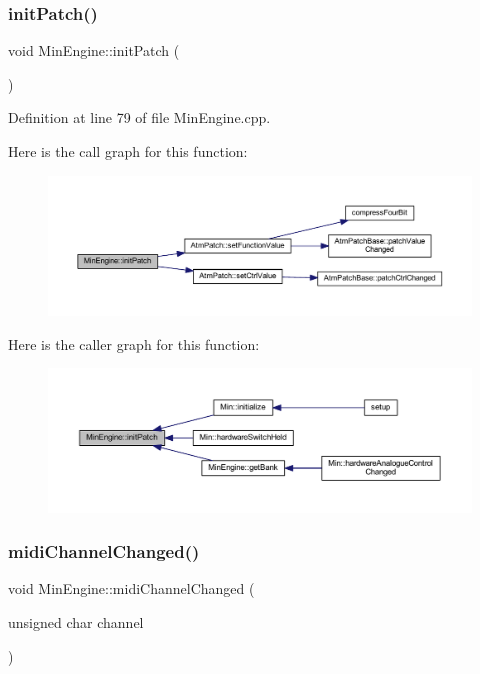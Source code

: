 \subsubsection{\texorpdfstring{init\+Patch()}{initPatch()}}
{\footnotesize\ttfamily void Min\+Engine\+::init\+Patch (\begin{DoxyParamCaption}{ }\end{DoxyParamCaption})}



Definition at line 79 of file Min\+Engine.\+cpp.

Here is the call graph for this function\+:
\nopagebreak
\begin{figure}[H]
\begin{center}
\leavevmode
\includegraphics[width=350pt]{class_min_engine_afd7005953daedf58d4332627e1592c07_cgraph}
\end{center}
\end{figure}
Here is the caller graph for this function\+:
\nopagebreak
\begin{figure}[H]
\begin{center}
\leavevmode
\includegraphics[width=350pt]{class_min_engine_afd7005953daedf58d4332627e1592c07_icgraph}
\end{center}
\end{figure}
\mbox{\label{class_min_engine_a5a88234cb86802788fd959d58efc9563}} 
\subsubsection{\texorpdfstring{midi\+Channel\+Changed()}{midiChannelChanged()}}
{\footnotesize\ttfamily void Min\+Engine\+::midi\+Channel\+Changed (\begin{DoxyParamCaption}\item[{unsigned char}]{channel }\end{DoxyParamCaption})\hspace{0.3cm}{\ttfamily [inline]}}



